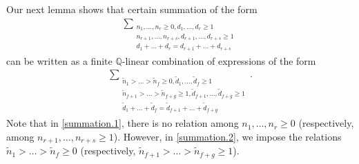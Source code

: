 \documentclass[12pt, reqno]{amsart}
\theoremstyle{definition}
\theoremstyle{remark}
\numberwithin{equation}{section}
\newcommand{\Q}{ \mathbb Q }
\newcommand{\w}{\tilde}
\numberwithin{equation}{section}
\begin{document}
Our next lemma shows that certain summation of the form 
\begin{eqnarray}  \label{summation.1}
\sum_{\substack{n_1, \ldots, n_r \ge 0, d_1, \ldots, d_r \ge 1\\
    n_{r+1}, \ldots, n_{r+s}, d_{r+1}, \ldots, d_{r+s} \ge 1\\
    d_1+ \ldots + d_r = d_{r+1} + \ldots + d_{r+s}}}
\end{eqnarray}
can be written as a finite $\Q$-linear combination of expressions of the form
\begin{eqnarray}   \label{summation.2}
\sum_{\substack{\w n_1 > \ldots > \w n_f \ge 0, 
    \w d_1, \ldots, \w d_f \ge 1\\
    \w n_{f+1}> \ldots > \w n_{f+g} \ge 1, 
    \w d_{f+1}, \ldots, \w d_{f+g} \ge 1\\
    \w d_1+ \ldots + \w d_f = \w d_{f+1} + \ldots + \w d_{f+g}}}.
\end{eqnarray}
Note that in \eqref{summation.1}, there is no relation among 
$n_1, \ldots, n_r \ge 0$ (respectively, among 
$n_{r+1}, \ldots, n_{r+s} \ge 1$). 
However, in \eqref{summation.2}, we impose the relations 
$\w n_1 > \ldots > \w n_f \ge 0$ (respectively,  
$\w n_{f+1}> \ldots > \w n_{f+g} \ge 1$).
\end{document}
